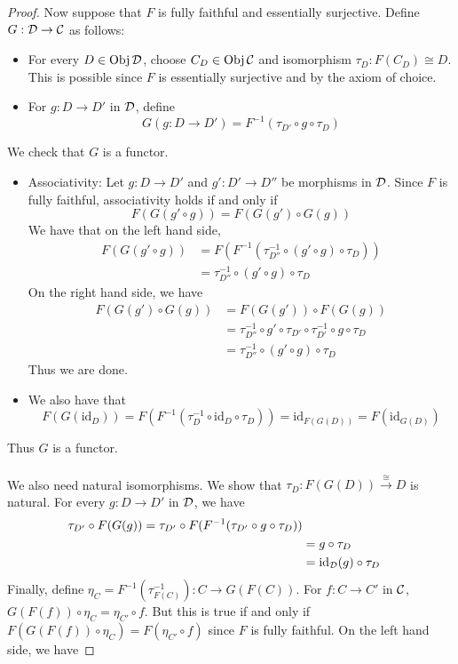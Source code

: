 \documentclass[a4paper]{article}
\begin{document}
\begin{prp}{}{}
\begin{proof}
Now suppose that $F$ is fully faithful and essentially surjective. Define $G:\mathcal{D}\to\mathcal{C}$ as follows: 
\begin{itemize}
\item For every $D\in\operatorname{Obj}\mathcal{D}$, choose $C_D\in\operatorname{Obj}\mathcal{C}$ and isomorphism $\tau_D:F(C_D)\cong D$. This is possible since $F$ is essentially surjective and by the axiom of choice. 
\item For $g:D\to D'$ in $\mathcal{D}$, define $$G(g:D\to D')=F^{-1}(\tau_{D'}\circ g\circ\tau_D)$$
\end{itemize}
We check that $G$ is a functor. 
\begin{itemize}
\item Associativity: Let $g:D\to D'$ and $g':D'\to D''$ be morphisms in $\mathcal{D}$. Since $F$ is fully faithful, associativity holds if and only if $$F(G(g'\circ g))=F(G(g')\circ G(g))$$ We have that on the left hand side, 
\begin{align*}
F(G(g'\circ g))&=F(F^{-1}(\tau_{D''}^{-1}\circ(g'\circ g)\circ\tau_D))\\
&=\tau_{D''}^{-1}\circ(g'\circ g)\circ\tau_D
\end{align*}
On the right hand side, we have 
\begin{align*}
F(G(g')\circ G(g))&=F(G(g'))\circ F(G(g))\\
&=\tau_{D''}^{-1}\circ g'\circ\tau_{D'}\circ\tau_{D'}^{-1}\circ g\circ\tau_D\\
&=\tau_{D''}^{-1}\circ(g'\circ g)\circ\tau_D
\end{align*}
Thus we are done. 
\item We also have that $$F(G(\text{id}_D))=F(F^{-1}(\tau_D^{-1}\circ\text{id}_D\circ\tau_D))=\text{id}_{F(G(D))}=F(\text{id}_{G(D)})$$
\end{itemize}
Thus $G$ is a functor. \\~\\
We also need natural isomorphisms. We show that $\tau_D:F(G(D))\overset{\cong}{\rightarrow}D$ is natural. For every $g:D\to D'$ in $\mathcal{D}$, we have 
\begin{align*}
\tau_{D'}\circ F(G(g))=\tau_{D'}\circ F(F^{-1}(\tau_{D'}\circ g\circ\tau_D))\\
&=g\circ\tau_D\\
&=\text{id}_{\mathcal{D}}(g)\circ\tau_D
\end{align*}
Finally, define $\eta_C=F^{-1}(\tau_{F(C)}^{-1}):C\to G(F(C))$. For $f:C\to C'$ in $\mathcal{C}$, $G(F(f))\circ\eta_C=\eta_{C'}\circ f$. But this is true if and only if $F(G(F(f))\circ\eta_C)=F(\eta_{C'}\circ f)$ since $F$ is fully faithful. On the left hand side, we have

\end{proof}
\end{prp}
\end{document}
